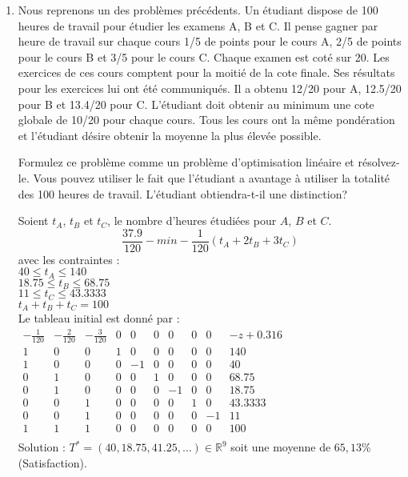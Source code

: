 \begin{enumerate}
  \item Nous reprenons un des problèmes précédents. Un étudiant dispose de 100 heures de travail pour
    étudier les examens A, B et C. Il pense gagner par heure de travail sur chaque cours 1/5 de points pour
    le cours A, 2/5 de points pour le cours B et 3/5 pour le cours C. Chaque examen est coté sur 20. Les
    exercices de ces cours comptent pour la moitié de la cote finale. Ses résultats pour les exercices lui
    ont été communiqués. Il a obtenu 12/20 pour A, 12.5/20 pour B et 13.4/20 pour C.  L'étudiant doit obtenir au minimum une cote globale de 10/20 pour chaque
    cours. Tous les cours ont la même pondération et l'étudiant désire obtenir la   moyenne la plus élevée possible.

    Formulez ce problème comme un problème d'optimisation linéaire  et résolvez-le. Vous pouvez utiliser le fait que l'étudiant a avantage à utiliser la
    totalité des 100 heures de travail. L'étudiant obtiendra-t-il une distinction?





    \begin{solution}
      Soient $t_{A}$, $t_{B}$ et $t_{C}$, le nombre d'heures étudiées pour $A$, $B$ et $C$.
      \newline
      $$ \frac{37.9}{120} - min - \frac{1}{120}(t_{A} + 2t_{B} + 3t_{C}) $$
      avec les contraintes : \\
      \newline
      $40 \le t_{A} \le 140$ \\
      $18.75 \le t_{B} \le 68.75 $ \\
      $11 \le t_{C} \le 43.3333$ \\
      $t_{A} + t_{B} + t_{C} = 100$ \\
      \newline
      Le tableau initial est donné par : \\
      \newline
      $\begin{array}
      {ccccccccc|l}
      -\frac{1}{120} & -\frac{2}{120} & -\frac{3}{120} &0&0&0&0&0&0& -z + 0.316\\ \hline
      1&0&0&1&0&0&0&0&0&140 \\
      1&0&0&0&-1&0&0&0&0&40 \\
      0&1&0&0&0&1&0&0&0&68.75 \\
      0&1&0&0&0&0&-1&0&0&18.75 \\
      0&0&1&0&0&0&0&1&0&43.3333 \\
      0&0&1&0&0&0&0&0&-1&11 \\
      1&1&1&0&0&0&0&0&0&100
      \\\end{array}$\\
      \newline
      \newline
      Solution : $T^{*} = (40,18.75,41.25,\dots) \in \mathbb{R}^{9}$ soit une moyenne de $65,13$\% (Satisfaction).
    \end{solution}


\end{enumerate}
